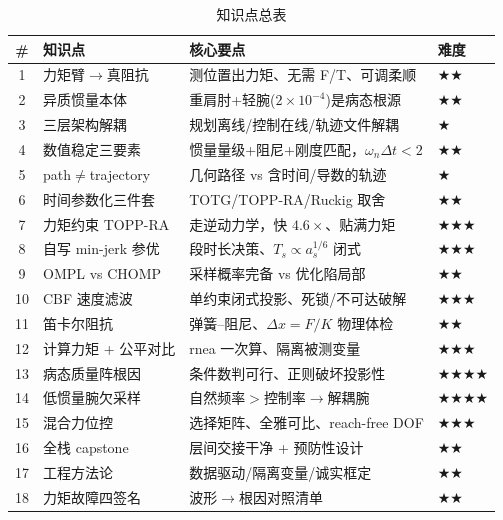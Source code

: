 \begin{table}[H]\centering\small
\caption{知识点总表}
\begin{tabular}{clll}
\toprule
\# & 知识点 & 核心要点 & 难度 \\
\midrule
1 & 力矩臂$\to$真阻抗 & 测位置出力矩、无需 F/T、可调柔顺 & \(\bigstar\bigstar\) \\
2 & 异质惯量本体 & 重肩肘+轻腕($2\!\times\!10^{-4}$)是病态根源 & \(\bigstar\bigstar\) \\
3 & 三层架构解耦 & 规划离线/控制在线/轨迹文件解耦 & \(\bigstar\) \\
4 & 数值稳定三要素 & 惯量量级+阻尼+刚度匹配，$\omega_n\Delta t<2$ & \(\bigstar\bigstar\) \\
5 & path$\ne$trajectory & 几何路径 vs 含时间/导数的轨迹 & \(\bigstar\) \\
6 & 时间参数化三件套 & TOTG/TOPP-RA/Ruckig 取舍 & \(\bigstar\bigstar\) \\
7 & 力矩约束 TOPP-RA & 走逆动力学，快 $4.6\times$、贴满力矩 & \(\bigstar\bigstar\bigstar\) \\
8 & 自写 min-jerk 参优 & 段时长决策、$T_s\propto a_s^{1/6}$ 闭式 & \(\bigstar\bigstar\bigstar\) \\
9 & OMPL vs CHOMP & 采样概率完备 vs 优化陷局部 & \(\bigstar\bigstar\) \\
10 & CBF 速度滤波 & 单约束闭式投影、死锁/不可达破解 & \(\bigstar\bigstar\bigstar\) \\
11 & 笛卡尔阻抗 & 弹簧--阻尼、$\Delta x=F/K$ 物理体检 & \(\bigstar\bigstar\) \\
12 & 计算力矩 + 公平对比 & rnea 一次算、隔离被测变量 & \(\bigstar\bigstar\bigstar\) \\
13 & 病态质量阵根因 & 条件数判可行、正则破坏投影性 & \(\bigstar\bigstar\bigstar\bigstar\) \\
14 & 低惯量腕欠采样 & 自然频率$>$控制率$\to$解耦腕 & \(\bigstar\bigstar\bigstar\bigstar\) \\
15 & 混合力位控 & 选择矩阵、全雅可比、reach-free DOF & \(\bigstar\bigstar\bigstar\) \\
16 & 全栈 capstone & 层间交接干净 + 预防性设计 & \(\bigstar\bigstar\) \\
17 & 工程方法论 & 数据驱动/隔离变量/诚实框定 & \(\bigstar\bigstar\) \\
18 & 力矩故障四签名 & 波形$\to$根因对照清单 & \(\bigstar\bigstar\) \\
\bottomrule
\end{tabular}
\end{table}

